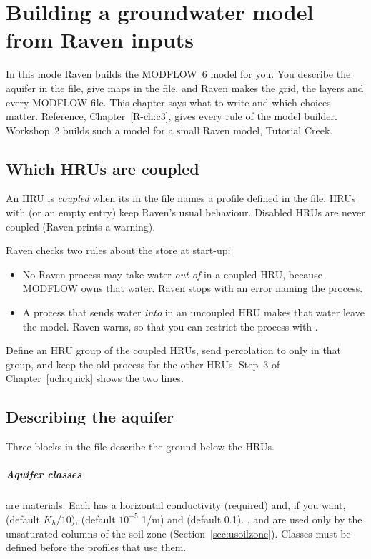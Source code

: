 \chapter{Building a groundwater model from Raven inputs}\label{uch:build}
In this mode Raven builds the MODFLOW~6 model for you. You describe the aquifer in the  file, give maps in
the  file, and Raven makes the grid, the layers and every MODFLOW file. This chapter says what to write and
which choices matter. Reference, Chapter~\ref{R-ch:c3}, gives every rule of the model builder. Workshop~2 builds such a
model for a small Raven model, Tutorial Creek.

\section{Which HRUs are coupled}
An HRU is \emph{coupled} when its  in the  file names a profile defined in the 
file. HRUs with \cmd{[NONE]} (or an empty entry) keep Raven's usual behaviour. Disabled HRUs are never coupled (Raven
prints a warning).

Raven checks two rules about the  store at start-up:
\begin{itemize}
\item No Raven process may take water \emph{out of}  in a coupled HRU, because MODFLOW owns that water.
Raven stops with an error naming the process.
\item A process that sends water \emph{into}  in an uncoupled HRU makes that water leave the model.
Raven warns, so that you can restrict the process with .
\end{itemize}
\begin{inpractice}
Define an HRU group of the coupled HRUs, send percolation to  only in that group, and keep the old
process for the other HRUs. Step~3 of Chapter~\ref{uch:quick} shows the two lines.
\end{inpractice}

\section{Describing the aquifer}\label{sec:uprofiles}
Three blocks in the  file describe the ground below the HRUs.

\paragraph{Aquifer classes} are materials. Each has a horizontal conductivity  (required) and, if you want,
 (default $K_h/10$),  (default $10^{-5}$ 1/m) and  (default 0.1).
,  and  are used only by the unsaturated columns of the soil zone
(Section~\ref{sec:usoilzone}). Classes must be defined before the profiles that use them.

